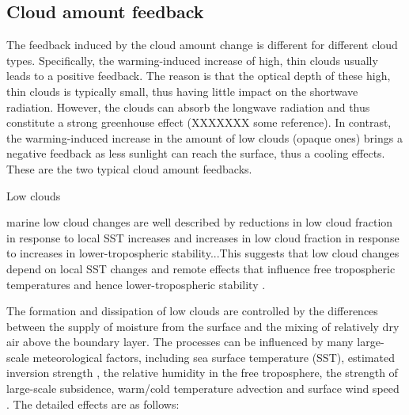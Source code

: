 
\subsection{Cloud amount feedback}
The feedback induced by the cloud amount change is different for different cloud types. Specifically, the warming-induced increase of high, thin clouds usually leads to a positive feedback. The reason is that the optical depth of these high, thin clouds is typically small, thus having little impact on the shortwave radiation. However, the clouds can absorb the longwave radiation and thus constitute a strong greenhouse effect (XXXXXXX some reference). In contrast, the warming-induced increase in the amount of low clouds (opaque ones) brings a negative feedback as less sunlight can reach the surface, thus a cooling effects. These are the two typical cloud amount feedbacks.

Low clouds

marine low cloud changes are well described by reductions in low cloud fraction in response to local SST increases \citep[e.g.,][]{Rieck2012, Webb2013coupling, Qu2014, Bretherton2015, Brient2016,Ceppi2017relationship} and increases in low cloud fraction in response to increases in lower-tropospheric stability...This suggests that low cloud changes depend on local SST changes and remote effects that influence free tropospheric temperatures and hence lower-tropospheric stability \citep[e.g.,][]{Zhou2015,Zhou2016,Zhou2017,Andrews2018}. 

The formation and dissipation of low clouds are controlled by the differences between the supply of moisture from the surface and the mixing of relatively dry air above the boundary layer. The processes can be influenced by many large-scale meteorological factors, including sea surface temperature (SST), estimated inversion strength \citep[EIS;][]{Wood2006}, the relative humidity in the free troposphere, the strength of large-scale subsidence, warm/cold temperature advection and surface wind speed \citep{Scott2020}. The detailed effects are as follows:

